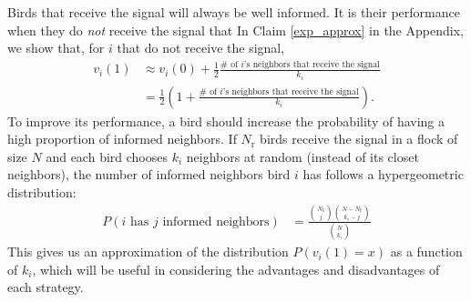 \documentclass{article}
\begin{document}
Birds that receive the signal will always be well informed. It is their performance when they do \emph{not} receive the signal that In Claim \ref{exp_approx} in the Appendix, we show that, for $i$ that do not receive the signal, 
\begin{align*}
v_i(1)&\approx v_{i}(0)+\frac{1}{2}\frac{\text{$\#$ of $i$'s neighbors that receive the signal}}{k_i}
\\&=\frac{1}{2}\left(1+\frac{\text{$\#$ of $i$'s neighbors that receive the signal}}{k_i}\right).
\end{align*}
To improve its performance, a bird should increase the probability of having a high proportion of informed neighbors. If $N_\text{r}$ birds receive the signal in a flock of size $N$ and each bird chooses $k_i$ neighbors at random (instead of its closet neighbors), the number of informed neighbors bird $i$ has follows a hypergeometric distribution:
\begin{align}
P(\text{$i$ has $j$  informed neighbors} )&=\frac{{N_\text{I}\choose j}{N-N_\text{I}\choose k_i-j}  }{{N\choose k_i}} \label{hypergeom}
\end{align} 
This gives us an approximation of the distribution $P(v_i(1)=x)$ as a function of $k_i$, which will be useful in considering the advantages and disadvantages of each strategy. 
\end{document}
